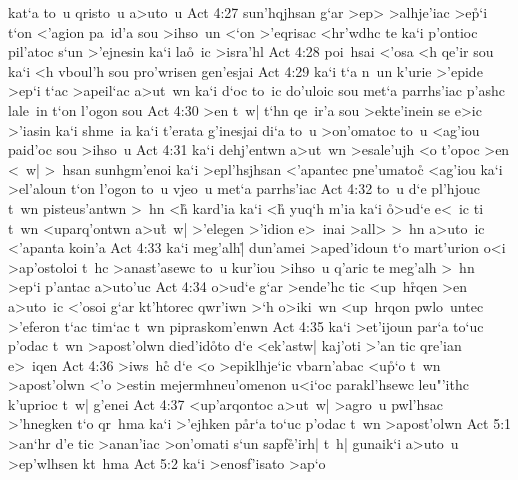 kat`a
to~u
qristo~u
a>uto~u\bibvsend
\vs Act 4:27
sun'hqjhsan
g`ar
>ep>
>alhje'iac
>e\r{p}`i
t`on
<'agion
pa~id'a
sou
>ihso~un
<`on
>'eqrisac
<hr'wdhc
te
ka`i
p'ontioc
pil'atoc
s`un
>'ejnesin
ka`i
la\r{o}~ic
>isra'hl\bibvsend
\vs Act 4:28
poi~hsai
<'osa
<h
qe'ir
sou
ka`i
<h
vboul'h
sou
pro'wrisen
gen'esjai\bibvsend
\vs Act 4:29
ka`i
t`a
n~un
k'urie
>'epide
>ep`i
t`ac
>apeil`ac
a>ut~wn
ka`i
d`oc
to~ic
do'uloic
sou
met`a
parrhs'iac
p'ashc
lale~in
t`on
l'ogon
sou\bibvsend
\vs Act 4:30
>en
t~w|
t`hn
qe~ir'a
sou
>ekte'inein
se
e>ic
>'iasin
ka`i
shme~ia
ka`i
t'erata
g'inesjai
di`a
to~u
>on'omatoc
to~u
<ag'iou
paid'oc
sou
>ihso~u\bibvsend
\vs Act 4:31
ka`i
dehj'entwn
a>ut~wn
>esale'ujh
<o
t'opoc
>en
<~w|
>~hsan
sunhgm'enoi
ka`i
>epl'hsjhsan
<'apantec
pne'umatoc\r{}
<ag'iou
ka`i
>el'aloun
t`on
l'ogon
to~u
vjeo~u
met`a
parrhs'iac\bibvsend
\vs Act 4:32
to~u
d`e
pl'hjouc
t~wn
pisteus'antwn
>~hn
<h\r{}
kard'ia
ka`i
<h\r{}
yuq`h
m'ia
ka`i
\r{o}>ud`e
e<~ic
ti
t~wn
<uparq'ontwn
a>u\r{t}~w|
>'elegen
>'idion
e>~inai
>all>
>~hn
a>uto~ic
<'apanta
koin'a\bibvsend
\vs Act 4:33
ka`i
meg'alh|\r{}
dun'amei
>aped'idoun
t`o
mart'urion
o<i
>ap'ostoloi
t~hc
>anast'asewc
to~u
kur'iou
>ihso~u
q'aric
te
meg'alh
>~hn
>ep`i
p'antac
a>uto'uc\bibvsend
\vs Act 4:34
o>ud`e
g`ar
>ende'hc
tic
<up~h\r{r}qen
>en
a>uto~ic
<'osoi
g`ar
kt'htorec
qwr'iwn
>`h
o>iki~wn
<up~hrqon
pwlo~untec
>'eferon
t`ac
tim`ac
t~wn
pipraskom'enwn\bibvsend
\vs Act 4:35
ka`i
>et'ijoun
par`a
to`uc
p'odac
t~wn
>apost'olwn
died'id\r{o}to
d`e
<ek'astw|
kaj'oti
>'an
tic
qre'ian
e>~iqen\bibvsend
\vs Act 4:36
>iws~h\r{c}
d`e
<o
>epiklhje`ic
vbarn'abac
<u\r{p}`o
t~wn
>apost'olwn
<'o
>estin
mejermhneu'omenon
u<i`oc
parakl'hsewc
leu"'ithc
k'uprioc
t~w|
g'enei\bibvsend
\vs Act 4:37
<up'arqontoc
a>ut~w|
>agro~u
pwl'hsac
>'hnegken
t`o
qr~hma
ka`i
>'ejhken
p\r{a}r`a
to`uc
p'odac
t~wn
>apost'olwn\bibvsend
\vs Act 5:1
>an`hr
d'e
tic
>anan'iac
>on'omati
s`un
sapf\r{e}'irh|
t~h|
gunaik`i
a>uto~u
>ep'wlhsen
kt~hma\bibvsend
\vs Act 5:2
ka`i
>enosf'isato
>ap`o
